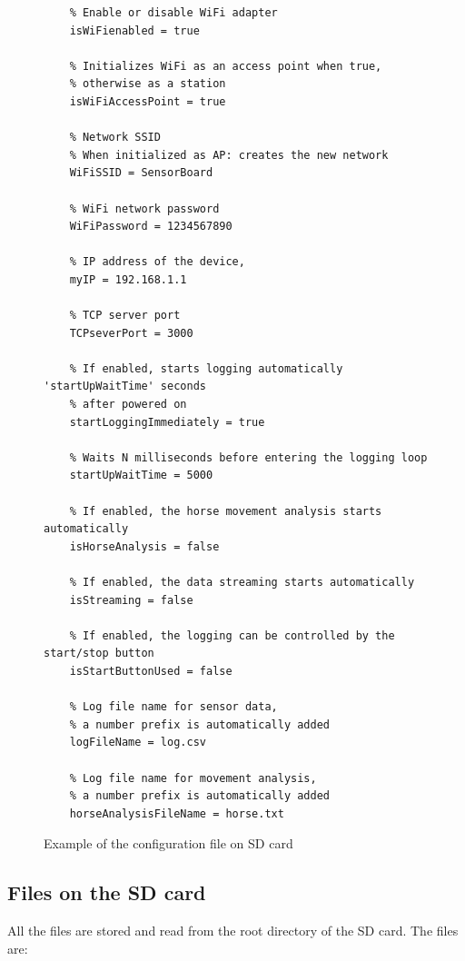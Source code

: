 \begin{figure}
    \centering
    \caption{Example of the configuration file on SD card}
    \label{SBconfigFile}
    \begin{verbatim}
    % Enable or disable WiFi adapter
    isWiFienabled = true
    
    % Initializes WiFi as an access point when true,
    % otherwise as a station
    isWiFiAccessPoint = true
    
    % Network SSID
    % When initialized as AP: creates the new network
    WiFiSSID = SensorBoard
    
    % WiFi network password
    WiFiPassword = 1234567890
    
    % IP address of the device,
    myIP = 192.168.1.1
    
    % TCP server port
    TCPseverPort = 3000
    
    % If enabled, starts logging automatically 'startUpWaitTime' seconds
    % after powered on
    startLoggingImmediately = true
    
    % Waits N milliseconds before entering the logging loop
    startUpWaitTime = 5000
    
    % If enabled, the horse movement analysis starts automatically
    isHorseAnalysis = false
    
    % If enabled, the data streaming starts automatically
    isStreaming = false
    
    % If enabled, the logging can be controlled by the start/stop button
    isStartButtonUsed = false
    
    % Log file name for sensor data,
    % a number prefix is automatically added
    logFileName = log.csv
    
    % Log file name for movement analysis,
    % a number prefix is automatically added
    horseAnalysisFileName = horse.txt
    \end{verbatim}
\end{figure}

\subsection{Files on the SD card}
All the files are stored and read from the root directory of the SD card. The files are:

